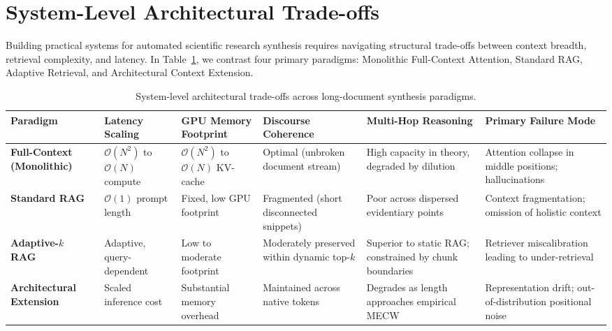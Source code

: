\documentclass[manuscript]{acmart}
\begin{document}
\section{System-Level Architectural Trade-offs}\label{sec:tradeoffs}
Building practical systems for automated scientific research synthesis requires navigating structural trade-offs between context breadth, retrieval complexity, and latency. In Table~\ref{tab:system_tradeoffs}, we contrast four primary paradigms: Monolithic Full-Context Attention, Standard RAG, Adaptive Retrieval, and Architectural Context Extension.

\begin{table}[htbp]
\small
\centering
\caption{System-level architectural trade-offs across long-document synthesis paradigms.}
\label{tab:system_tradeoffs}
\begin{tabularx}{\textwidth}{l p{2.2cm} p{2.2cm} p{2.8cm} p{3.0cm} p{3.2cm}}
\toprule
\textbf{Paradigm} & \textbf{Latency Scaling} & \textbf{GPU Memory Footprint} & \textbf{Discourse Coherence} & \textbf{Multi-Hop Reasoning} & \textbf{Primary Failure Mode} \\
\midrule
\textbf{Full-Context (Monolithic)} & $\mathcal{O}(N^2)$ to $\mathcal{O}(N)$ compute & $\mathcal{O}(N^2)$ to $\mathcal{O}(N)$ KV-cache & Optimal (unbroken document stream) & High capacity in theory, degraded by dilution & Attention collapse in middle positions; hallucinations \\
\addlinespace
\textbf{Standard RAG~\cite{lewis2020rag}} & $\mathcal{O}(1)$ prompt length & Fixed, low GPU footprint & Fragmented (short disconnected snippets) & Poor across dispersed evidentiary points & Context fragmentation; omission of holistic context \\
\addlinespace
\textbf{Adaptive-$k$ RAG~\cite{taguchi2025adaptivek}} & Adaptive, query-dependent & Low to moderate footprint & Moderately preserved within dynamic top-$k$ & Superior to static RAG; constrained by chunk boundaries & Retriever miscalibration leading to under-retrieval \\
\addlinespace
\textbf{Architectural Extension~\cite{chen2023interpolation,su2024roformer}} & Scaled inference cost & Substantial memory overhead & Maintained across native tokens & Degrades as length approaches empirical MECW & Representation drift; out-of-distribution positional noise \\
\bottomrule
\end{tabularx}
\end{table}
\end{document}
